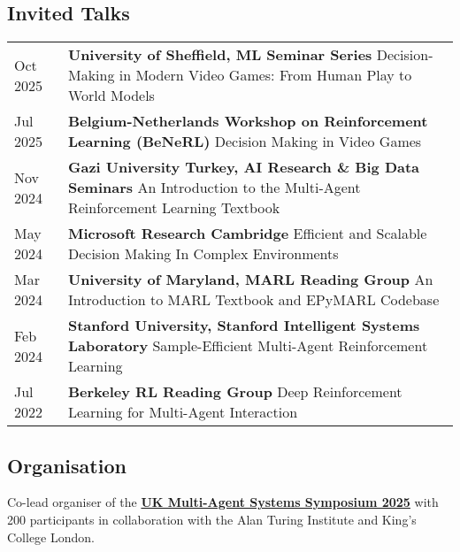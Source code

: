 \documentclass[a4paper,12pt]{article}
\begin{document}
\subsection{Invited Talks}
\begin{tabularx}{\linewidth}{@{}l X@{}}
    Oct 2025 & \textbf{University of Sheffield, ML Seminar Series} \newline Decision-Making in Modern Video Games: From Human Play to World Models \\
    Jul 2025 & \textbf{Belgium-Netherlands Workshop on Reinforcement Learning (BeNeRL)} \newline Decision Making in Video Games \\
    Nov 2024 & \textbf{Gazi University Turkey, AI Research \& Big Data Seminars} \newline An Introduction to the Multi-Agent Reinforcement Learning Textbook \\
    May 2024 & \textbf{Microsoft Research Cambridge} \newline Efficient and Scalable Decision Making In Complex Environments \\
    Mar 2024 & \textbf{University of Maryland, MARL Reading Group} \newline An Introduction to MARL Textbook and EPyMARL Codebase \\
    Feb 2024 & \textbf{Stanford University, Stanford Intelligent Systems Laboratory} \newline Sample-Efficient Multi-Agent Reinforcement Learning \\
    Jul 2022 & \textbf{Berkeley RL Reading Group} \newline Deep Reinforcement Learning for Multi-Agent Interaction \\
\end{tabularx}
\expspace

\subsection{Organisation}

\begin{expblock}
    Co-lead organiser of the \href{https://www.turing.ac.uk/events/uk-multi-agent-systems-symposium-2025-uk-mas}{\textbf{UK Multi-Agent Systems Symposium 2025}} with 200 participants in collaboration with the Alan Turing Institute and King's College London.
\end{expblock}
\end{document}
